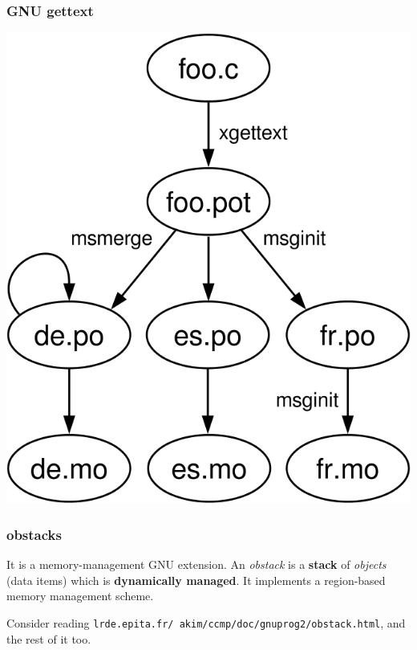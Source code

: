 \documentclass{beamer}
\begin{document}
\begin{frame}[fragile]
  \frametitle{GNU gettext}
  \begin{center}
    \includegraphics[scale=0.3]{Gettext}
  \end{center}
\end{frame}

\begin{frame}
  \frametitle{obstacks}
It is a memory-management GNU extension. An \textit{obstack} is a
\textbf{stack} of \textit{objects} (data items) which is \textbf{dynamically
managed}. It implements a region-based memory management scheme.

\vfill

Consider reading
\texttt{lrde.epita.fr/~akim/ccmp/doc/gnuprog2/obstack.html}, and
the rest of it too.
\end{frame}
\end{document}
